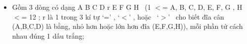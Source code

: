 \begin{itemize}
	\item Gồm 3 dòng có dạng A B C D r E F G H  (1 $<$= A, B, C, D, E, F, G , H $<$= 12 ; r là 1 trong 3 kí tự ‘=’ , ‘$<$’ , hoặc  ‘$>$’  cho biết đĩa cân (A,B,C,D) là bằng, nhỏ hơn hoặc lớn hơn đĩa (E,F,G,H)), mỗi phần tử cách nhau đúng 1 dấu trắng;
\end{itemize}